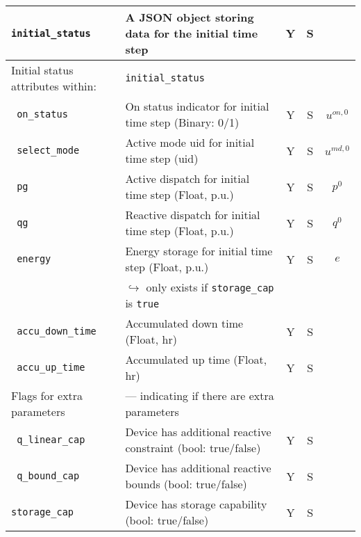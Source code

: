 \documentclass{article}
\begin{document}
\begin{center}
\begin{tabular}{ l | l | c | c | c |}
  {\tt initial\_status} & A JSON object storing data for the initial time step & Y & S &  \\
  \hline \hline
  Initial status attributes within: &  {\tt initial\_status} &  &  & \\
  \hline    
  {\tt\color{red} on\_status} & On status indicator for initial time step (Binary: 0/1) & Y & S & $u^{on,0}$\\
  {\tt\color{red} select\_mode}  & Active mode uid for initial time step (uid) & Y & S & $u^{md,0}$\\
  {\tt\color{red} pg} & Active dispatch for initial time step (Float, p.u.) & Y & S & $p^0$ \\
  {\tt\color{red} qg} & Reactive dispatch for initial time step (Float, p.u.)& Y & S & $q^0$ \\
  {\tt\color{red} energy} & Energy storage for initial time step (Float, p.u.)& Y & S & $e$\\  
                          & $\hookrightarrow$ only exists if \texttt{storage\_cap} is \texttt{true} & & & \\  
  {\tt\color{red} accu\_down\_time} & Accumulated down time (Float, hr) & Y & S & \\  
  {\tt\color{red} accu\_up\_time} & Accumulated up time (Float, hr) & Y & S & \\  
  \hline \hline
  Flags for extra parameters &  --- indicating if there are extra parameters &  &  & \\
  \hline
  {\tt\color{red} q\_linear\_cap}      & Device has additional reactive constraint (bool: true/false) & Y & S & \\
  {\tt\color{red} q\_bound\_cap}       & Device has additional reactive bounds (bool: true/false) & Y & S & \\
  {\tt storage\_cap}       & Device has storage capability (bool: true/false) & Y & S & \\
  \hline \hline
  \end{tabular}
\end{center}
\end{document}
